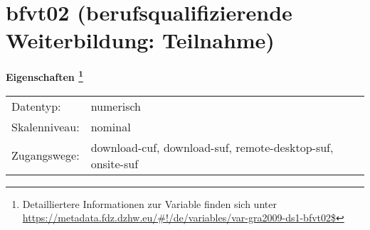 
    \setcounter{footnote}{0}

    \vspace*{-1.8cm}
	\section{bfvt02 (berufsqualifizierende Weiterbildung: Teilnahme)}
	\label{section:bfvt02}



    \vspace*{0.5cm}
    \noindent\textbf{Eigenschaften
	\footnote{Detailliertere Informationen zur Variable finden sich unter
		\url{https://metadata.fdz.dzhw.eu/\#!/de/variables/var-gra2009-ds1-bfvt02$}}}\\
	\begin{tabularx}{\hsize}{@{}lX}
	Datentyp: & numerisch \\
	Skalenniveau: & nominal \\
	Zugangswege: &
	  download-cuf, 
	  download-suf, 
	  remote-desktop-suf, 
	  onsite-suf
 \\
    \end{tabularx}



